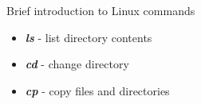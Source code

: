 \documentclass{beamer}
\begin{document}
\begin{frame}{Brief introduction to Linux commands}
\begin{itemize}
  \item \textit{\textbf{ls}} - list directory contents
  \item \textit{\textbf{cd}} - change directory
  \item \textit{\textbf{cp}} - copy files and directories
\end{itemize}
\end{frame}
\end{document}
